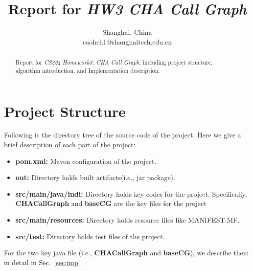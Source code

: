 \documentclass[conference]{IEEEtran}
\begin{document}
\title{Report for \textit{HW3 CHA Call Graph}}


\author{
Shanghai, China\\
caohch1@shanghaitech.edu.cn}


\maketitle
\begin{abstract}
    Report for \textit{CS224 Homework3: CHA Call Graph}, including project structure, algorithm introduction, and Implementation description.
\end{abstract}

\section{Project Structure}
Following is the directory tree of the source code of the project:
Here we give a brief description of each part of the project:
\begin{itemize}
    \item \textbf{pom.xml: } Maven configuration of the project.
    \item \textbf{out: } Directory holds built artifacts(i.e., jar package).
    \item \textbf{src/main/java/indi: } Directory holds key codes for the project. Specifically, \textbf{CHACallGraph} and \textbf{baseCG} are the key files for the project
    \item \textbf{src/main/resources: } Directory holds resource files like MANIFEST.MF.
    \item \textbf{src/test: } Directory holds test files of the project.
\end{itemize}

For the two key java file (i.e., \textbf{CHACallGraph} and \textbf{baseCG}), we describe them in detail in Sec.~\ref{sec:imp}.
\end{document}
